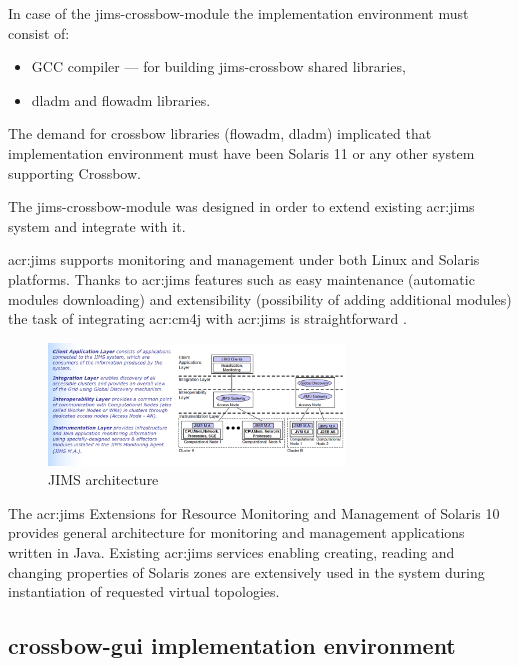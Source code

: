 \documentclass[11pt,openany]{book}
\begin{document}
        In case of the jims-crossbow-module the implementation environment must consist of:

        \begin{itemize}
          \item GCC compiler --- for building jims-crossbow shared libraries,
          \item dladm and flowadm libraries.
        \end{itemize}
	
        The demand for crossbow libraries (flowadm, dladm) implicated that implementation environment must have been
        Solaris 11 or any other system supporting Crossbow.

        The jims-crossbow-module was designed in order to extend existing \gls{acr:jims} system and integrate with it.

        \gls{acr:jims} supports monitoring and management under both Linux and Solaris platforms. Thanks to
        \gls{acr:jims} features such as easy maintenance (automatic modules downloading) and extensibility (possibility
        of adding additional modules) the task of integrating \gls{acr:cm4j} with \gls{acr:jims} is straightforward
        \cite{jims}.
      
        \begin{figure}[H]
          \begin{center}
            \includegraphics[width=0.7\textwidth]{img/jims/jims.png}
          \end{center}
          \caption{JIMS architecture \cite{jims}}
        \end{figure}

        The \gls{acr:jims} Extensions for Resource Monitoring and Management of Solaris 10 provides general architecture
        for monitoring and management applications written in Java. Existing \gls{acr:jims} services enabling creating,
        reading and changing properties of Solaris zones are extensively used in the system during instantiation of
        requested virtual topologies.


     \subsection{crossbow-gui implementation environment}
\end{document}
